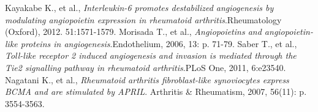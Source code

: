 \documentclass[11pt]{article}
\theoremstyle{plain}
\theoremstyle{definition}
\theoremstyle{remark}
\begin{document}
\begin{thebibliography}{20}
Kayakabe K., et al., {\em Interleukin-6 promotes destabilized angiogenesis by modulating angiopoietin expression in rheumatoid arthritis}.Rheumatology (Oxford), 2012. 51:1571-1579.
Morisada T., et al., {\em Angiopoietins and angiopoietin-like proteins in angiogenesis}.Endothelium, 2006, 13: p. 71-79.
Saber T., et al., {\em  Toll-like receptor 2 induced angiogenesis and invasion is mediated through the Tie2 signalling pathway in rheumatoid arthritis}.PLoS One, 2011, 6:e23540.
Nagatani K., et al., {\em Rheumatoid arthritis fibroblast-like synoviocytes express BCMA and are stimulated by APRIL}. Arthritis \& Rheumatism, 2007, 56(11): p. 3554-3563.

\end{thebibliography}
\end{document}
